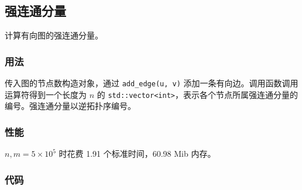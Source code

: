 \subsection{强连通分量}

计算有向图的强连通分量。

\subsubsection{用法}

传入图的节点数构造对象，通过 \lstinline{add_edge(u, v)} 添加一条有向边。调用函数调用运算符得到一个长度为 $n$ 的 \lstinline{std::vector<int>}，表示各个节点所属强连通分量的编号。强连通分量以逆拓扑序编号。

\subsubsection{性能}

$n, m = 5 \times 10^5$ 时花费 1.91 个标准时间，60.98 Mib 内存。

\subsubsection{代码}


